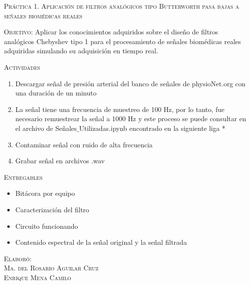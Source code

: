 \documentclass[10pt,letterpaper,spanish,twoside]{report}
\begin{document}
\docdate

\begin{center}
 \textsc{\asignatura}\vspace{.2em}
\end{center}

\textsc{Práctica 1. Aplicación de filtros analógicos tipo Butterworth pasa bajas a señales biomédicas reales}

\textsc{Objetivo:} 
Aplicar los conocimientos adquiridos sobre el diseño de filtros analógicos Chebyshev tipo 1 para el procesamiento de señales biomédicas reales adquiridas simulando su adquisición en tiempo real.

\textsc{Actividades}
\begin{enumerate}
  \item Descargar señal de presión arterial del banco de señales de physioNet.org con una duración de un minuto
  \item La señal tiene una frecuencia de muestreo de 100 Hz, por lo tanto, fue necesario remuestrear la señal a 1000 Hz y este proceso se puede consultar en el archivo de Señales$\_$Utilizadas.ipynb encontrado en la siguiente liga *
  \item Contaminar señal con ruido de alta frecuencia 
  \item Grabar señal en archivos .wav
\end{enumerate}

\textsc{Entregables}
\begin{itemize}
  \item Bitácora por equipo
  \item Caracterización del filtro
  \item Circuito funcionando
  \item Contenido espectral de la señal original y la señal filtrada
\end{itemize}


\vfill
\begin{flushright}
\textsc{Elaboró:\\
Ma. del Rosario Aguilar Cruz\\
Enrique Mena Camilo}
\end{flushright}
\end{document}
